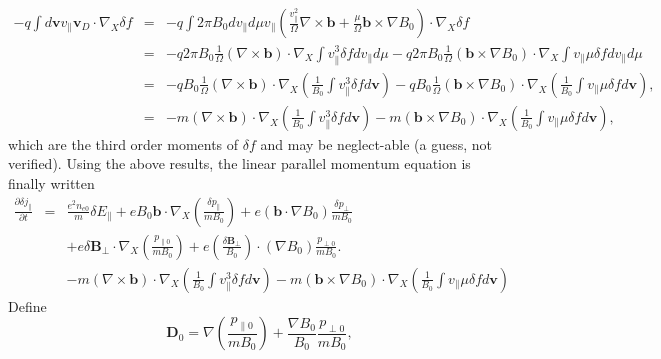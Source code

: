 \documentclass{llncs}
\begin{document}
\begin{eqnarray}
  - q \int d\mathbf{v}v_{\parallel} \mathbf{v}_D \cdot \nabla_X \delta f & = &
  - q \int 2 \pi B_0 d v_{\parallel} d \mu v_{\parallel} \left(
  \frac{v_{\parallel}^2}{\Omega} \nabla \times \mathbf{b}+ \frac{\mu}{\Omega}
  \mathbf{b} \times \nabla B_0 \right) \cdot \nabla_X \delta f \nonumber\\
  & = & - q 2 \pi B_0  \frac{1}{\Omega} (\nabla \times \mathbf{b}) \cdot
  \nabla_X \int v_{\parallel}^3 \delta f d v_{\parallel} d \mu - q 2 \pi B_0
  \frac{1}{\Omega} (\mathbf{b} \times \nabla B_0) \cdot \nabla_X \int
  v_{\parallel} \mu \delta f d v_{\parallel} d \mu \nonumber\\
  & = & - q B_0  \frac{1}{\Omega} (\nabla \times \mathbf{b}) \cdot \nabla_X
  \left( \frac{1}{B_0} \int v_{\parallel}^3 \delta f d\mathbf{v} \right) - q
  B_0 \frac{1}{\Omega} (\mathbf{b} \times \nabla B_0) \cdot \nabla_X \left(
  \frac{1}{B_0} \int v_{\parallel} \mu \delta f d\mathbf{v} \right),
  \nonumber\\
  & = & - m (\nabla \times \mathbf{b}) \cdot \nabla_X \left( \frac{1}{B_0}
  \int v_{\parallel}^3 \delta f d\mathbf{v} \right) - m (\mathbf{b} \times
  \nabla B_0) \cdot \nabla_X \left( \frac{1}{B_0} \int v_{\parallel} \mu
  \delta f d\mathbf{v} \right), 
\end{eqnarray}
which are the third order moments of $\delta f$ and may be neglect-able (a
guess, not verified). Using the above results, the linear parallel momentum
equation is finally written
\begin{eqnarray}
  \frac{\partial \delta j_{\parallel}}{\partial t} & = & \frac{e^2 n_{e 0}}{m}
  \delta E_{\parallel} + e B_0 \mathbf{b} \cdot \nabla_X \left( \frac{\delta
  p_{\parallel}}{m B_0} \right) + e (\mathbf{b} \cdot \nabla B_0) \frac{\delta
  p_{\perp}}{m B_0} \nonumber\\
  &  & + e \delta \mathbf{B}_{\perp} \cdot \nabla_X \left( \frac{p_{\parallel
  0}}{m B_0} \right) + e \left( \frac{\delta \mathbf{B}_{\perp}}{B_0} \right)
  \cdot (\nabla B_0) \frac{p_{\perp 0}}{m B_0} . \nonumber\\
  &  & - m (\nabla \times \mathbf{b}) \cdot \nabla_X \left( \frac{1}{B_0}
  \int v_{\parallel}^3 \delta f d\mathbf{v} \right) - m (\mathbf{b} \times
  \nabla B_0) \cdot \nabla_X \left( \frac{1}{B_0} \int v_{\parallel} \mu
  \delta f d\mathbf{v} \right)  \label{17-5-19-2}
\end{eqnarray}
Define
\begin{equation}
  \mathbf{D}_0 = \nabla \left( \frac{p_{\parallel 0}}{m B_0} \right) +
  \frac{\nabla B_0}{B_0} \frac{p_{\perp 0}}{m B_0},
\end{equation}
\end{document}

